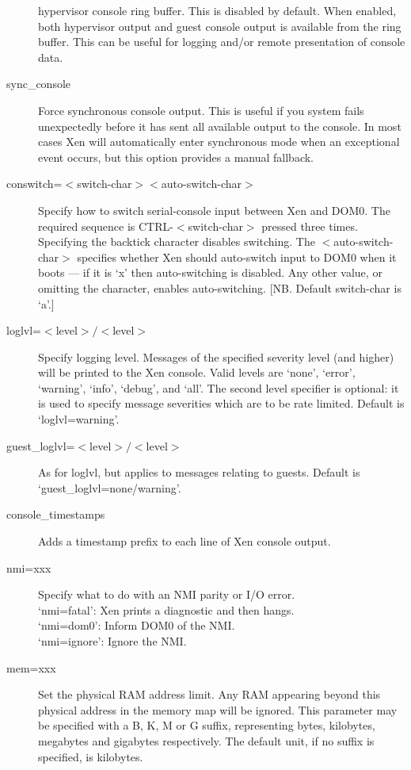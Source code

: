 \documentclass[11pt,twoside,final,openright]{report}
\begin{document}
\begin{description}
  hypervisor console ring buffer. This is disabled by default.
  When enabled, both hypervisor output and guest console output
  is available from the ring buffer. This can be useful for logging
  and/or remote presentation of console data.
\item [ sync\_console ] Force synchronous console output. This is
  useful if you system fails unexpectedly before it has sent all
  available output to the console. In most cases Xen will
  automatically enter synchronous mode when an exceptional event
  occurs, but this option provides a manual fallback.
\item [ conswitch=$<$switch-char$><$auto-switch-char$>$ ] Specify how
  to switch serial-console input between Xen and DOM0. The required
  sequence is CTRL-$<$switch-char$>$ pressed three times. Specifying
  the backtick character disables switching.  The
  $<$auto-switch-char$>$ specifies whether Xen should auto-switch
  input to DOM0 when it boots --- if it is `x' then auto-switching is
  disabled.  Any other value, or omitting the character, enables
  auto-switching.  [NB. Default switch-char is `a'.]
\item [ loglvl=$<$level$>/<$level$>$ ]
  Specify logging level. Messages of the specified severity level (and
  higher) will be printed to the Xen console. Valid levels are `none',
  `error', `warning', `info', `debug', and `all'. The second level
  specifier is optional: it is used to specify message severities
  which are to be rate limited. Default is `loglvl=warning'.
\item [ guest\_loglvl=$<$level$>/<$level$>$ ] As for loglvl, but
  applies to messages relating to guests. Default is
  `guest\_loglvl=none/warning'. 
\item [ console\_timestamps ] 
  Adds a timestamp prefix to each line of Xen console output.
\item [ nmi=xxx ]
  Specify what to do with an NMI parity or I/O error. \\
  `nmi=fatal':  Xen prints a diagnostic and then hangs. \\
  `nmi=dom0':   Inform DOM0 of the NMI. \\
  `nmi=ignore': Ignore the NMI.
\item [ mem=xxx ] Set the physical RAM address limit. Any RAM
  appearing beyond this physical address in the memory map will be
  ignored. This parameter may be specified with a B, K, M or G suffix,
  representing bytes, kilobytes, megabytes and gigabytes respectively.
  The default unit, if no suffix is specified, is kilobytes.

\end{description}
\end{document}
